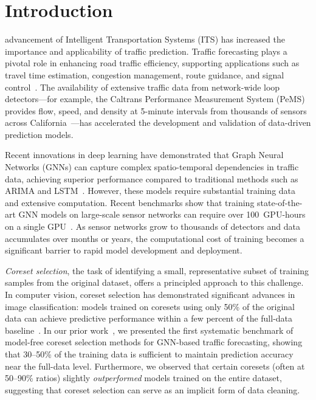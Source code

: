 \documentclass[journal]{IEEEtran}
\begin{document}
\section{Introduction}
\label{sec:introduction}

 advancement of Intelligent Transportation
Systems (ITS) has increased the importance and applicability of
traffic prediction.
Traffic forecasting plays a pivotal role in enhancing road traffic
efficiency, supporting applications such as travel time estimation,
congestion management, route guidance, and signal
control~\cite{vlahogianni_short-term_2014}.
The availability of extensive traffic data from network-wide loop
detectors---for example, the Caltrans Performance Measurement System
(PeMS) provides flow, speed, and density at 5-minute intervals from
thousands of sensors across
California~\cite{chen_freeway_2001}---has accelerated the development
and validation of data-driven prediction models.

Recent innovations in deep learning have demonstrated that Graph
Neural Networks (GNNs) can capture complex spatio-temporal
dependencies in traffic data, achieving superior performance compared
to traditional methods such as ARIMA and
LSTM~\cite{wu_graph_2019, yu_spatio-temporal_2018, cui_traffic_2019}.
However, these models require substantial training data and extensive
computation.
Recent benchmarks show that training state-of-the-art GNN models on
large-scale sensor networks can require over 100~GPU-hours on a single
GPU~\cite{liu_largest_2023}.
As sensor networks grow to thousands of detectors and data accumulates
over months or years, the computational cost of training becomes a
significant barrier to rapid model development and deployment.

\textit{Coreset selection}, the task of identifying a small,
representative subset of training samples from the original dataset,
offers a principled approach to this challenge.
In computer vision, coreset selection has demonstrated significant
advances in image classification: models trained on coresets using
only 50\% of the original data can achieve predictive performance
within a few percent of the full-data
baseline~\cite{xia_moderate_2022, maharana_d2_2023, tan_data_2025}.
In our prior work~\cite{our_itsc}, we presented the first systematic
benchmark of model-free coreset selection methods for GNN-based traffic
forecasting, showing that 30--50\% of the training data is sufficient
to maintain prediction accuracy near the full-data level.
Furthermore, we observed that certain coresets (often at 50--90\%
ratios) slightly \emph{outperformed} models trained on the entire
dataset, suggesting that coreset selection can serve as an implicit
form of data cleaning.
\end{document}
